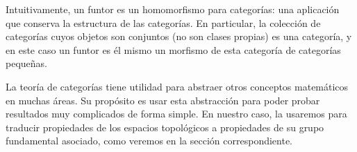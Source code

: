 \begin{obs}
Intuitivamente, un funtor es un homomorfismo para categorías: una aplicación que conserva la estructura de las categorías. En particular, la colección de categorías cuyos objetos son conjuntos (no son clases propias) es una categoría, y en este caso un funtor es él mismo un morfismo de esta categoría de categorías pequeñas.
\end{obs}

La teoría de categorías tiene utilidad para abstraer otros conceptos matemáticos en muchas áreas. Su propósito es usar esta abstracción para poder probar resultados muy complicados de forma simple. En nuestro caso, la usaremos para traducir propiedades de los espacios topológicos a propiedades de su grupo fundamental asociado, como veremos en la sección correspondiente.